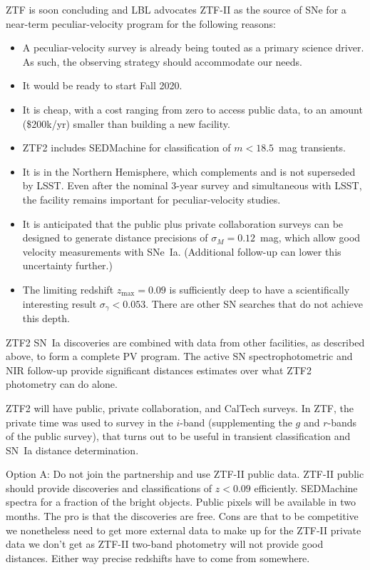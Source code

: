 ZTF is soon concluding and LBL advocates ZTF-II as the source of SNe for a near-term peculiar-velocity program
for the following reasons:
\begin{itemize}
\item A peculiar-velocity survey is already being touted as a primary science driver. As such,
the observing strategy should accommodate our needs.
\item It would be ready to start Fall 2020.
\item It is cheap, with a cost ranging from zero to access public data, to an amount (\$200k/yr) smaller
than building a new facility.
\item ZTF2 includes SEDMachine for classification of $m<18.5$~mag  transients.
\item It is in the Northern Hemisphere, which complements and is not superseded by LSST. 
Even after the nominal 3-year survey and simultaneous with LSST, the facility remains important for peculiar-velocity studies.
\item It is anticipated that the public plus private collaboration surveys can be designed to generate distance
precisions of $\sigma_M =0.12$~mag, which allow good velocity measurements with SNe~Ia.  (Additional follow-up can lower this uncertainty further.)
\item The limiting redshift $z_{\text{max}} =0.09$ is sufficiently deep  to have a scientifically interesting result $\sigma_\gamma < 0.053$.
There are other SN searches that do not achieve this depth.
\end{itemize}

ZTF2 SN~Ia discoveries are combined with data from other facilities, as described above, to form a complete PV program.  
The active SN spectrophotometric and NIR follow-up provide significant distances estimates over
what ZTF2 photometry can do alone.




ZTF2 will have public, private collaboration, and CalTech surveys.    In ZTF,
the private time was used to survey in the $i$-band (supplementing the $g$ and $r$-bands of the public survey), that turns out to be useful in transient classification and SN~Ia distance determination.

Option A: Do not join the partnership and use ZTF-II public data.
ZTF-II public should provide discoveries and classifications of $z<0.09$ efficiently.  SEDMachine spectra for a
fraction of the bright objects.  Public pixels will be available in two months.
The pro is that the discoveries are free.
Cons are  that to be competitive we nonetheless need to get more external data to make up for the ZTF-II private data
we don't get as ZTF-II two-band photometry will not provide good distances.  
Either way precise redshifts have to come from somewhere.


